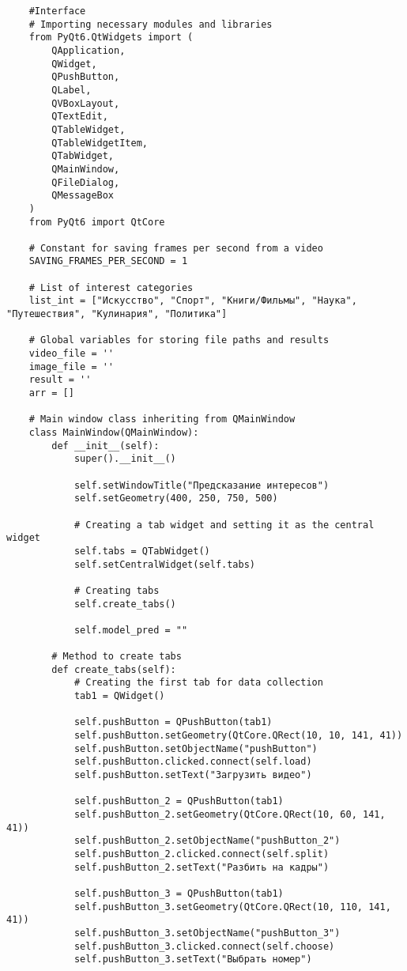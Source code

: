 \begin{lstlisting}
    #Interface
    # Importing necessary modules and libraries
    from PyQt6.QtWidgets import (
        QApplication, 
        QWidget, 
        QPushButton, 
        QLabel, 
        QVBoxLayout, 
        QTextEdit, 
        QTableWidget, 
        QTableWidgetItem,
        QTabWidget,
        QMainWindow,
        QFileDialog,
        QMessageBox
    )
    from PyQt6 import QtCore

    # Constant for saving frames per second from a video
    SAVING_FRAMES_PER_SECOND = 1

    # List of interest categories
    list_int = ["Искусство", "Спорт", "Книги/Фильмы", "Наука", "Путешествия", "Кулинария", "Политика"]

    # Global variables for storing file paths and results
    video_file = ''
    image_file = ''
    result = ''
    arr = []

    # Main window class inheriting from QMainWindow
    class MainWindow(QMainWindow):
        def __init__(self):
            super().__init__()

            self.setWindowTitle("Предсказание интересов")
            self.setGeometry(400, 250, 750, 500)

            # Creating a tab widget and setting it as the central widget
            self.tabs = QTabWidget()
            self.setCentralWidget(self.tabs)

            # Creating tabs
            self.create_tabs()

            self.model_pred = ""

        # Method to create tabs
        def create_tabs(self):
            # Creating the first tab for data collection
            tab1 = QWidget()
            
            self.pushButton = QPushButton(tab1)
            self.pushButton.setGeometry(QtCore.QRect(10, 10, 141, 41))
            self.pushButton.setObjectName("pushButton")
            self.pushButton.clicked.connect(self.load)
            self.pushButton.setText("Загрузить видео")

            self.pushButton_2 = QPushButton(tab1)
            self.pushButton_2.setGeometry(QtCore.QRect(10, 60, 141, 41))
            self.pushButton_2.setObjectName("pushButton_2")
            self.pushButton_2.clicked.connect(self.split)
            self.pushButton_2.setText("Разбить на кадры")

            self.pushButton_3 = QPushButton(tab1)
            self.pushButton_3.setGeometry(QtCore.QRect(10, 110, 141, 41))
            self.pushButton_3.setObjectName("pushButton_3")
            self.pushButton_3.clicked.connect(self.choose)
            self.pushButton_3.setText("Выбрать номер")


\end{lstlisting}
